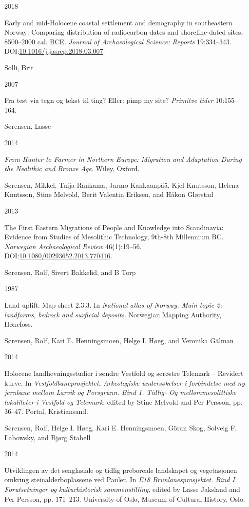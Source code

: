 \documentclass[
  12pt,
  a4paper,
  oneside]{book}
\newlength{\cslhangindent}
\newlength{\csllabelwidth}
\newlength{\cslentryspacingunit} %
\newenvironment{CSLReferences}[2] %
 {%
  \setlength{\parindent}{0pt}
  \ifodd #1
  \let\oldpar\par
  \def\par{\hangindent=\cslhangindent\oldpar}
  \fi
  \setlength{\parskip}{#2\cslentryspacingunit}
 }%
 {}
\newcommand{\CSLBlock}[1]{#1\hfill\break}
\newcommand{\CSLLeftMargin}[1]{\parbox[t]{\csllabelwidth}{#1}}
\newcommand{\CSLRightInline}[1]{\parbox[t]{\linewidth - \csllabelwidth}{#1}\break}
\begin{document}
\begin{CSLReferences}{0}{0}
\leavevmode{}%
\CSLLeftMargin{ 2018 }
\CSLRightInline{Early and mid-Holocene coastal settlement and demography in southeastern Norway: Comparing distribution of radiocarbon dates and shoreline-dated sites, 8500--2000 cal. BCE. \emph{Journal of Archaeological Science: Reports} 19:334--343. DOI:\href{https://doi.org/10.1016/j.jasrep.2018.03.007}{10.1016/j.jasrep.2018.03.007}.}

\leavevmode{}%
\CSLBlock{Solli, Brit}
\CSLLeftMargin{ 2007}
\CSLRightInline{{Fra test via tegn og tekst til ting? Eller: pimp my site?} \emph{Primitve tider} 10:155--164.}

\leavevmode{}%
\CSLBlock{Sørensen, Lasse}
\CSLLeftMargin{ 2014}
\CSLRightInline{\emph{{From Hunter to Farmer in Northern Europe: Migration and Adaptation During the Neolithic and Bronze Age}}. Wiley, Oxford.}

\leavevmode{}%
\CSLBlock{Sørensen, Mikkel, Tuija Rankama, Jarmo Kankaanpää, Kjel Knutsson, Helena Knutsson, Stine Melvold, Berit Valentin Eriksen, and Håkon Glørstad}
\CSLLeftMargin{ 2013}
\CSLRightInline{{The First Eastern Migrations of People and Knowledge into Scandinavia: Evidence from Studies of Mesolithic Technology, 9th-8th Millennium BC}. \emph{Norwegian Archaeological Review} 46(1):19--56. DOI:\href{https://doi.org/10.1080/00293652.2013.770416}{10.1080/00293652.2013.770416}.}

\leavevmode{}%
\CSLBlock{Sørensen, Rolf, Sivert Bakkelid, and B Torp}
\CSLLeftMargin{ 1987}
\CSLRightInline{{Land uplift. Map sheet 2.3.3}. In \emph{{National atlas of Norway. Main topic 2: landforms, bedrock and surficial deposits}}. Norwegian Mapping Authority, Hønefoss.}

\leavevmode{}%
\CSLBlock{Sørensen, Rolf, Kari E. Henningsmoen, Helge I. Høeg, and Veronika Gälman}
\CSLLeftMargin{ 2014}
\CSLRightInline{{Holocene landhevningsstudier i søndre Vestfold og sørøstre Telemark -- Revidert kurve}. In \emph{{Vestfoldbaneprosjektet. Arkeologiske undersøkelser i forbindelse med ny jernbane mellom Larvik og Porsgrunn. Bind 1. Tidlig- Og mellommesolittiske lokaliteter i Vestfold og Telemark}}, edited by Stine Melvold and Per Persson, pp. 36--47. Portal, Kristiansand.}

\leavevmode{}%
\CSLBlock{Sørensen, Rolf, Helge I. Høeg, Kari E. Henningsmoen, Göran Skog, Solveig F. Labowsky, and Bjørg Stabell}
\CSLLeftMargin{ 2014}
\CSLRightInline{{Utviklingen av det senglasiale og tidlig preboreale landskapet og vegetasjonen omkring steinalderboplassene ved Pauler}. In \emph{{E18 Brunlanesprosjektet. Bind I. Forutsetninger og kulturhistorisk sammenstilling}}, edited by Lasse Jaksland and Per Persson, pp. 171--213. University of Oslo, Museum of Cultural History, Oslo.}


\end{CSLReferences}
\end{document}

